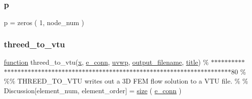 \mbox{\label{a00614_ac483f6ce851c9ecd9fb835ff7551737c}} 
\subsubsection{\texorpdfstring{p}{p}}
{\footnotesize\ttfamily p = zeros ( 1, node\+\_\+num )}

\mbox{\label{a00614_ae9816988ffcdbae1aa51d6906e1497ff}} 
\subsubsection{\texorpdfstring{threed\+\_\+to\+\_\+vtu}{threed\_to\_vtu}}
{\footnotesize\ttfamily \hyperlink{a00611_a2420833d971716e9bab41cc9fb3abba1}{function} threed\+\_\+to\+\_\+vtu(\hyperlink{a00605_ac98c3bb25378222646e977292011625f}{x}, \hyperlink{a00611_a4b51eee3b0df698c7db4e3d113502bc0}{e\+\_\+conn}, \hyperlink{a00617_a9c137ebda5c84e833481db1dd6531003}{uvwp}, \hyperlink{a00617_a5934d690c688edbd92210f38fe5855e7}{output\+\_\+filename}, \hyperlink{a00617_a051e403214cb6872ad3fe4e50302a6ee}{title}) \% $\ast$$\ast$$\ast$$\ast$$\ast$$\ast$$\ast$$\ast$$\ast$$\ast$$\ast$$\ast$$\ast$$\ast$$\ast$$\ast$$\ast$$\ast$$\ast$$\ast$$\ast$$\ast$$\ast$$\ast$$\ast$$\ast$$\ast$$\ast$$\ast$$\ast$$\ast$$\ast$$\ast$$\ast$$\ast$$\ast$$\ast$$\ast$$\ast$$\ast$$\ast$$\ast$$\ast$$\ast$$\ast$$\ast$$\ast$$\ast$$\ast$$\ast$$\ast$$\ast$$\ast$$\ast$$\ast$$\ast$$\ast$$\ast$$\ast$$\ast$$\ast$$\ast$$\ast$$\ast$$\ast$$\ast$$\ast$$\ast$$\ast$$\ast$$\ast$$\ast$$\ast$$\ast$$\ast$$\ast$$\ast$80 \% \%\% T\+H\+R\+E\+E\+D\+\_\+\+T\+O\+\_\+\+V\+TU writes out a 3\+D F\+E\+M flow solution to a V\+T\+U file. \% \% Discussion\mbox{[}element\+\_\+num, element\+\_\+order\mbox{]} = \hyperlink{a00611_ad6cb0afbbe6ea4f56407890be2533966}{size} ( \hyperlink{a00611_a4b51eee3b0df698c7db4e3d113502bc0}{e\+\_\+conn} )}

\mbox{\label{a00614_ab72eb62a9262d5c8dbb6ce78753722f7}} 
